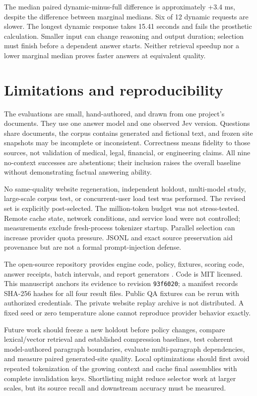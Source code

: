 \documentclass[11pt]{article}
\begin{document}
The median paired dynamic-minus-full difference is approximately +3.4 ms, despite the difference between marginal medians. Six of 12 dynamic requests are slower. The longest dynamic response takes 15.41 seconds and fails the prosthetic calculation. Smaller input can change reasoning and output duration; selection must finish before a dependent answer starts. Neither retrieval speedup nor a lower marginal median proves faster answers at equivalent quality.

\section{Limitations and reproducibility}
The evaluations are small, hand-authored, and drawn from one project's documents. They use one answer model and one observed Jev version. Questions share documents, the corpus contains generated and fictional text, and frozen site snapshots may be incomplete or inconsistent. Correctness means fidelity to those sources, not validation of medical, legal, financial, or engineering claims. All nine no-context successes are abstentions; their inclusion raises the overall baseline without demonstrating factual answering ability.

No same-quality website regeneration, independent holdout, multi-model study, large-scale corpus test, or concurrent-user load test was performed. The revised set is explicitly post-selected. The million-token budget was not stress-tested. Remote cache state, network conditions, and service load were not controlled; measurements exclude fresh-process tokenizer startup. Parallel selection can increase provider quota pressure. JSONL and exact source preservation aid provenance but are not a formal prompt-injection defense.

The open-source repository provides engine code, policy, fixtures, scoring code, answer receipts, batch intervals, and report generators \cite{artifact}. Code is MIT licensed. This manuscript anchors its evidence to revision \texttt{93f6020}; a manifest records SHA-256 hashes for all four result files. Public QA fixtures can be rerun with authorized credentials. The private website replay archive is not distributed. A fixed seed or zero temperature alone cannot reproduce provider behavior exactly.

Future work should freeze a new holdout before policy changes, compare lexical/vector retrieval and established compression baselines, test coherent model-authored paragraph boundaries, evaluate multi-paragraph dependencies, and measure paired generated-site quality. Local optimizations should first avoid repeated tokenization of the growing context and cache final assemblies with complete invalidation keys. Shortlisting might reduce selector work at larger scales, but its source recall and downstream accuracy must be measured.
\end{document}
